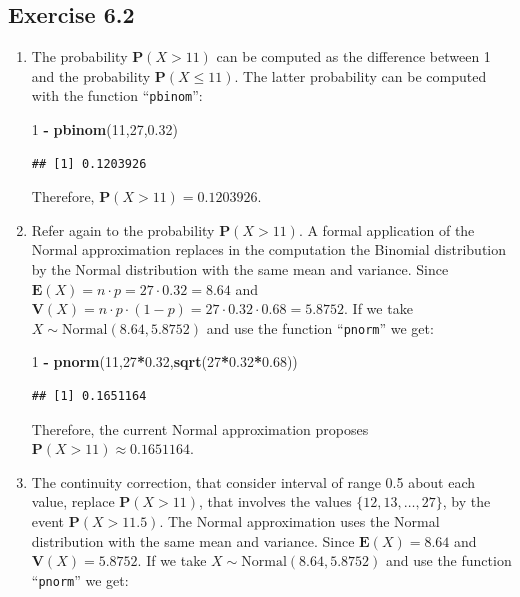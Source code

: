 \documentclass[
]{krantz}
\makeatletter
\newenvironment{Shaded}{\begin{snugshade}}{\end{snugshade}}
\newcommand{\DecValTok}[1]{\textcolor[rgb]{0.00,0.00,0.81}{#1}}
\newcommand{\FloatTok}[1]{\textcolor[rgb]{0.00,0.00,0.81}{#1}}
\newcommand{\KeywordTok}[1]{\textcolor[rgb]{0.13,0.29,0.53}{\textbf{#1}}}
\newcommand{\NormalTok}[1]{#1}
\newcommand{\OperatorTok}[1]{\textcolor[rgb]{0.81,0.36,0.00}{\textbf{#1}}}
\newcommand{\StringTok}[1]{\textcolor[rgb]{0.31,0.60,0.02}{#1}}
\newcommand{\Expec}{\mathbf{E}}
\newcommand{\Prob}{\mathbf{P}}
\newcommand{\Var}{\mathbf{V}}
\newenvironment{kframe}{%
\medskip{}
\setlength{\fboxsep}{.8em}
 \def\at@end@of@kframe{}%
 \ifinner\ifhmode%
  \def\at@end@of@kframe{\end{minipage}}%
  \begin{minipage}{\columnwidth}%
 \fi\fi%
 \def\FrameCommand##1{\hskip\@totalleftmargin \hskip-\fboxsep
 \colorbox{shadecolor}{##1}\hskip-\fboxsep
     \hskip-\linewidth \hskip-\@totalleftmargin \hskip\columnwidth}%
 \MakeFramed {\advance\hsize-\width
   \@totalleftmargin\z@ \linewidth\hsize
   \@setminipage}}%
 {\par\unskip\endMakeFramed%
 \at@end@of@kframe}
\renewenvironment{Shaded}{\begin{kframe}}{\end{kframe}}
\theoremstyle{definition}
\theoremstyle{definition}
\theoremstyle{definition}
\theoremstyle{remark}
\makeatother
\begin{document}
\hypertarget{exercise-6.2}{%
\subsection*{Exercise 6.2}\label{exercise-6.2}}


\begin{enumerate}
\def\labelenumi{\arabic{enumi}.}
\item
  The probability \(\Prob(X > 11)\) can be
  computed as the difference between 1 and the probability
  \(\Prob(X \leq 11)\). The latter probability can be computed with the
  function ``\texttt{pbinom}'':

\begin{Shaded}
\begin{Highlighting}[]
\DecValTok{1} \OperatorTok{-}\StringTok{ }\KeywordTok{pbinom}\NormalTok{(}\DecValTok{11}\NormalTok{,}\DecValTok{27}\NormalTok{,}\FloatTok{0.32}\NormalTok{)}
\end{Highlighting}
\end{Shaded}

\begin{verbatim}
## [1] 0.1203926
\end{verbatim}

  Therefore, \(\Prob(X > 11) = 0.1203926\).
\item
  Refer again to the probability
  \(\Prob(X > 11)\). A formal application of the Normal approximation
  replaces in the computation the Binomial distribution by the Normal
  distribution with the same mean and variance. Since
  \(\Expec(X) = n \cdot p = 27 \cdot 0.32 = 8.64\) and
  \(\Var(X) = n \cdot p \cdot (1-p) = 27 \cdot 0.32 \cdot 0.68 = 5.8752\).
  If we take \(X \sim \mbox{Normal}(8.64,5.8752)\) and use the function
  ``\texttt{pnorm}'' we get:

\begin{Shaded}
\begin{Highlighting}[]
\DecValTok{1} \OperatorTok{-}\StringTok{ }\KeywordTok{pnorm}\NormalTok{(}\DecValTok{11}\NormalTok{,}\DecValTok{27}\OperatorTok{*}\FloatTok{0.32}\NormalTok{,}\KeywordTok{sqrt}\NormalTok{(}\DecValTok{27}\OperatorTok{*}\FloatTok{0.32}\OperatorTok{*}\FloatTok{0.68}\NormalTok{))}
\end{Highlighting}
\end{Shaded}

\begin{verbatim}
## [1] 0.1651164
\end{verbatim}

  Therefore, the current Normal approximation proposes
  \(\Prob(X > 11) \approx 0.1651164\).
\item
  The continuity correction, that
  consider interval of range 0.5 about each value, replace
  \(\Prob(X > 11)\), that involves the values \(\{12, 13, \ldots, 27\}\), by
  the event \(\Prob(X > 11.5)\). The Normal approximation uses the Normal
  distribution with the same mean and variance. Since \(\Expec(X) = 8.64\)
  and \(\Var(X) = 5.8752\). If we take \(X \sim \mbox{Normal}(8.64,5.8752)\)
  and use the function ``\texttt{pnorm}'' we get:


\end{enumerate}
\end{document}
